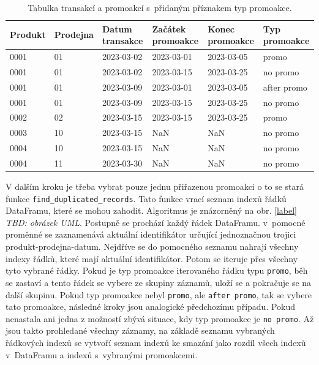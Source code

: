 \begin{table}[hbtp!]
    \centering
    \captionsetup{justification=centering}
    \caption{Tabulka transakcí a promoakcí s~přidaným příznakem typ promoakce.}
    \begin{tabular}{llp{2cm}p{2.1cm}p{2cm}p{2.5cm}}
        \toprule
        Produkt & Prodejna & Datum transakce & Začátek promoakce & Konec \newline promoakce& Typ \newline promoakce\\
        \midrule
        0001 & 01 & 2023-03-02 & 2023-03-01 & 2023-03-05 & promo \\
        0001 & 01 & 2023-03-02 & 2023-03-15 & 2023-03-25 & no promo \\
        0001 & 01 & 2023-03-09 & 2023-03-01 & 2023-03-05 & after promo \\
        0001 & 01 & 2023-03-09 & 2023-03-15 & 2023-03-25 & no promo \\
        0002 & 02 & 2023-03-15 & 2023-03-15 & 2023-03-25 & promo\\
        0003 & 10 & 2023-03-15 & NaN & NaN & no promo \\
        0004 & 10 & 2023-03-15 & NaN & NaN & no promo \\
        0004 & 11 & 2023-03-30 & NaN & NaN & no promo \\
        \bottomrule
    \end{tabular}
    \label{tab:tabulkalabely}
\end{table}

V dalším kroku je třeba vybrat pouze jednu přiřazenou promoakci o to se stará funkce \texttt{find\_duplicated\_records}. Tato funkce vrací seznam indexů řádků DataFramu, které se mohou zahodit. Algoritmus je znázorněný na obr. \ref*{label} \emph{TBD: obrázek UML}.
Postupně se prochází každý řádek DataFramu. v~pomocné proměnné se zaznamenává aktuální identifikátor určující jednoznačnou trojici produkt-prodejna-datum. Nejdříve se do pomocného seznamu nahrají všechny indexy řádků, které mají aktuální identifikátor. Potom se iteruje přes všechny tyto vybrané řádky. Pokud je typ promoakce iterovaného řádku typu \texttt{promo}, běh se zastaví a tento řádek se vybere ze skupiny záznamů, uloží se a pokračuje se na další skupinu. Pokud typ promoakce nebyl \texttt{promo}, ale \texttt{after promo}, tak se vybere tato promoakce, následné kroky jsou analogické předchozímu případu. Pokud nenastala ani jedna z možností zbývá situace, kdy typ promoakce je \texttt{no promo}. Až jsou takto prohledané všechny záznamy, na základě seznamu vybraných řádkových indexů se vytvoří seznam indexů ke smazání jako rozdíl všech indexů v~DataFramu a indexů s~vybranými promoakcemi.

